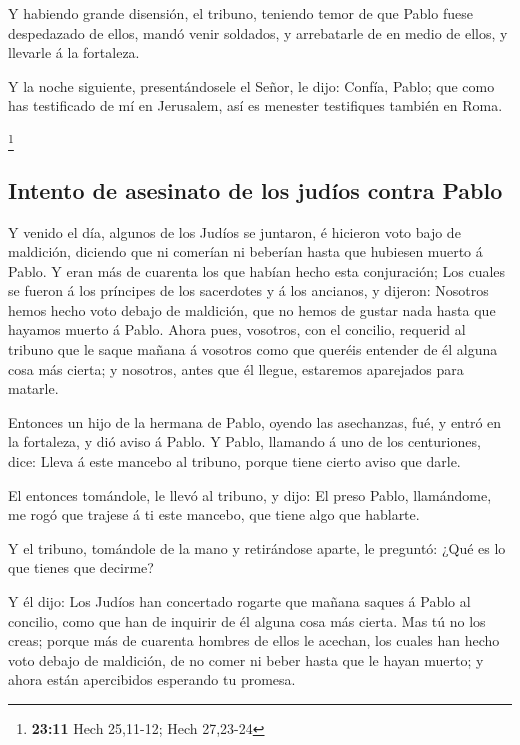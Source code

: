  Y habiendo grande disensión, el tribuno, teniendo temor de
que Pablo fuese despedazado de ellos, mandó venir soldados, y
arrebatarle de en medio de ellos, y llevarle á la fortaleza.

 Y la noche siguiente, presentándosele el Señor, le dijo:
Confía, Pablo; que como has testificado de mí en Jerusalem, así es
menester testifiques también en Roma.

\footnote{\textbf{23:11} Hech 25,11-12; Hech 27,23-24}

\hypertarget{intento-de-asesinato-de-los-juduxedos-contra-pablo}{%
\subsection{Intento de asesinato de los judíos contra
Pablo}\label{intento-de-asesinato-de-los-juduxedos-contra-pablo}}

 Y venido el día, algunos de los Judíos se juntaron, é
hicieron voto bajo de maldición, diciendo que ni comerían ni beberían
hasta que hubiesen muerto á Pablo.  Y eran más de cuarenta
los que habían hecho esta conjuración;  Los cuales se
fueron á los príncipes de los sacerdotes y á los ancianos, y dijeron:
Nosotros hemos hecho voto debajo de maldición, que no hemos de gustar
nada hasta que hayamos muerto á Pablo.  Ahora pues,
vosotros, con el concilio, requerid al tribuno que le saque mañana á
vosotros como que queréis entender de él alguna cosa más cierta; y
nosotros, antes que él llegue, estaremos aparejados para matarle.

 Entonces un hijo de la hermana de Pablo, oyendo las
asechanzas, fué, y entró en la fortaleza, y dió aviso á Pablo.
 Y Pablo, llamando á uno de los centuriones, dice: Lleva á
este mancebo al tribuno, porque tiene cierto aviso que darle.

 El entonces tomándole, le llevó al tribuno, y dijo: El
preso Pablo, llamándome, me rogó que trajese á ti este mancebo, que
tiene algo que hablarte.

 Y el tribuno, tomándole de la mano y retirándose aparte,
le preguntó: ¿Qué es lo que tienes que decirme?

 Y él dijo: Los Judíos han concertado rogarte que mañana
saques á Pablo al concilio, como que han de inquirir de él alguna cosa
más cierta.  Mas tú no los creas; porque más de cuarenta
hombres de ellos le acechan, los cuales han hecho voto debajo de
maldición, de no comer ni beber hasta que le hayan muerto; y ahora están
apercibidos esperando tu promesa.

